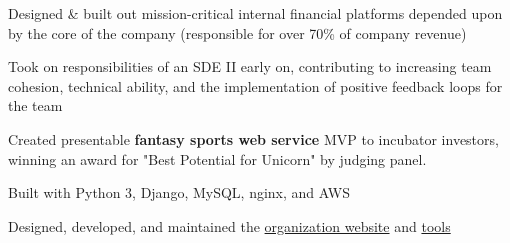 \documentclass[]{two-column-resume}
\begin{document}
\begin{minipage}[t]{0.65\textwidth}

\vspace{\topsep} %

\begin{tightemize}
\item Designed \& built out mission-critical internal financial platforms depended upon by the core of the company (responsible for over 70\% of company revenue)
\item Took on responsibilities of an SDE II early on, contributing to increasing team cohesion, technical ability, and the implementation of positive feedback loops for the team
\end{tightemize}
\sectionsep


\vspace{0.9em} %

\begin{tightemize}
\item Created presentable {\bf fantasy sports web service} MVP to
incubator investors, winning an award for "Best Potential for Unicorn"
by judging panel.
\item Built with Python 3, Django, MySQL, nginx, and AWS
\end{tightemize}
\sectionsep


\vspace{\topsep} %

\begin{tightemize}
\item Designed, developed, and maintained the 
\href{https://www.skullhouse.nyc}{organization website} and 
\href{https://github.com/JasonYao/Bobst-Room-Automator}{tools}
\end{tightemize}
\sectionsep



\end{minipage}
\end{document}
